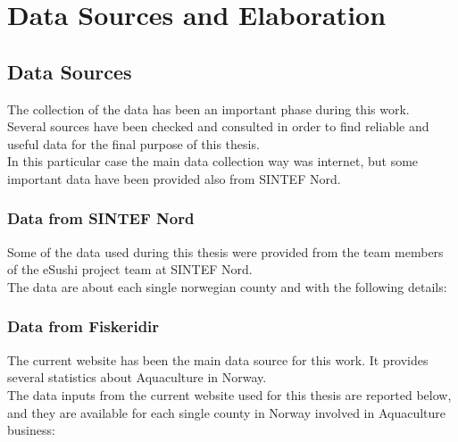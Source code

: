 
\newpage
\chapter{Data Sources and Elaboration}
\section{Data Sources}
The collection of the data has been an important phase during this work. \\
Several sources have been checked and consulted in order to find reliable and useful data for the final purpose of this thesis.\\
In this particular case the main data collection way was internet, but some important data have been provided also from SINTEF Nord.
\citation{}

\subsection{Data from SINTEF Nord}
Some of the data used during this thesis were provided from the team members of the eSushi project team at SINTEF Nord. \\
The data are about each single norwegian county and with the following details:\\

\begin{table}[ht]
    \caption{Data provided from SINTEF Nord.}
    \label{table: SINTEF_Data} 
\end{table}



\newpage
 
\subsection{Data from Fiskeridir} 
The current website has been the main data source for this work. It provides several statistics about Aquaculture in Norway.\\
The data inputs from the current website used for this thesis are reported below, and they are available for each single county in Norway involved in Aquaculture business:

